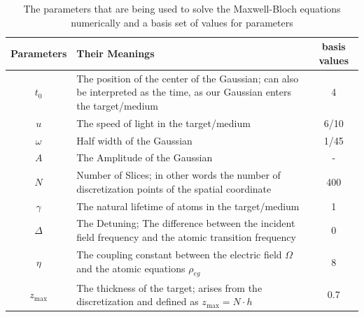 \begin{table}
    \centering
    \begin{tabular}{|c|p{10cm}|c|}
    \hline Parameters&Their Meanings & basis values\\ \hline
        $t_0$ & The position of the center of the Gaussian; can also be interpreted as the time, as our Gaussian enters the target/medium & 4 \\ \hline
        $u$ &  The speed of light in the target/medium & 6/10\\ \hline
        $\omega$ & Half width of the Gaussian &1/45 \\ \hline
        $A$ &  The Amplitude of the Gaussian & - \\ \hline
        $N$  & Number of Slices; in other words the number of discretization points of the spatial coordinate& 400 \\ \hline
        $\gamma$ & The natural lifetime of atoms in the target/medium & 1\\ \hline
        $\Delta$ & The Detuning; The difference between the incident field frequency and the atomic transition frequency & 0\\ \hline
        $\eta$ & The coupling constant between the electric field $\Omega$ and the atomic equations $\rho_{eg}$ & 8 \\ \hline
        $z_\mathrm{max}$ & The thickness of the target; arises from the discretization and defined as $z_\mathrm{max} = N\cdot h$& 0.7 \\\hline
    \end{tabular}
    \caption{The parameters that are being used to solve the Maxwell-Bloch equations numerically and a basis set of values for parameters}
    \label{table:the_parameters}
\end{table}

